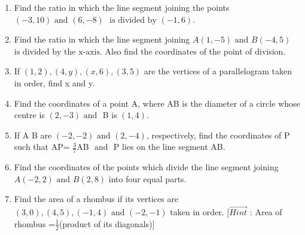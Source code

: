 \begin{enumerate}[label=\thesection.\arabic*,ref=\thesection.\theenumi]
\item Find the ratio in which the line segment joining the points $(-3,10) \text{ and } (6,-8)$ $\text{ is divided by } (-1,6)$.
	\\
		\solution
	
\item Find the ratio in which the line segment joining $A(1,-5) \text{ and } B(-4,5)$ $\text{is divided by the x-axis}$. Also find the coordinates of the point of division.
\item If $(1,2), (4,y), (x,6), (3,5)$ are the vertices of a parallelogram taken in order, find x and y.
	\\
		\solution
	
\item Find the coordinates of a point A, where AB is the diameter of a circle whose centre is $(2,-3) \text{ and }$ B is $(1,4)$.
	\\
		\solution
	
\item If A  B are $(-2,-2) \text{ and } (2,-4)$, respectively, find the coordinates of P such that AP= $\frac {3}{7}$AB $\text{ and }$ P lies on the line segment AB.
	\\
		\solution
	
\item Find the coordinates of the points which divide the line segment joining $A(-2,2) \text{ and } B(2,8)$ into four equal parts.
	\\
		\solution
	
\item Find the area of a rhombus if its vertices are $(3,0), (4,5), (-1,4) \text{ and } (-2,-1)$ taken in order. [$\vec{Hint}$ : Area of rhombus =$\frac {1}{2}$(product of its diagonals)]
	\\
		\solution
	

\end{enumerate}

